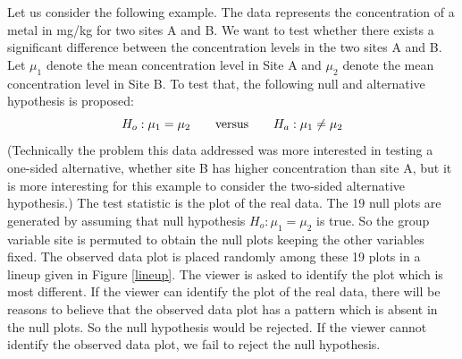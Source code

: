\documentclass[12]{article}
\begin{document}
Let us consider the following example. The data represents the concentration of a metal in mg/kg for two sites A and B.
We want to test whether there exists a significant difference between the concentration levels in the two sites A and B. Let $\mu_1$ denote the mean concentration level in Site A and $\mu_2$ denote the mean concentration level in Site B. To test that, the following null and alternative hypothesis is proposed:
\[
H_o: \mu_1 = \mu_2 \qquad \hbox{versus} \qquad H_a: \mu_1 \ne \mu_2
\]
(Technically the problem this data addressed was more interested in testing a one-sided alternative, whether site B has higher concentration than site A, but it is more interesting for this example to consider the two-sided alternative hypothesis.) The test statistic is the plot of the real data. The 19 null plots are generated by assuming that null hypothesis $H_o: \mu_1 =  \mu_2$ is true. So the group variable site is permuted to obtain the null plots keeping the other variables fixed. The observed data plot is placed randomly among these 19 plots in a lineup given in Figure \ref{lineup}. The viewer is asked to identify the plot which is most different. If the viewer can identify the plot of the real data, there will be reasons to believe that the observed data plot has a pattern which is absent in the null plots. So the null hypothesis would be rejected. If the viewer cannot identify the observed data plot, we fail to reject the null hypothesis. 
\end{document}
